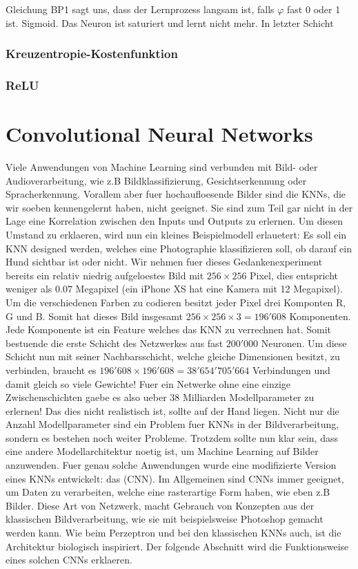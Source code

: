 Gleichung BP1 sagt uns, dass der Lernprozess langsam ist, falls $\varphi$ fast 0
oder 1 ist. Sigmoid. Das Neuron ist saturiert und lernt nicht mehr. In letzter Schicht

\subsection{Kreuzentropie-Kostenfunktion}

\subsection{ReLU}

\pagebreak
\chapter{Convolutional Neural Networks}
Viele Anwendungen von Machine Learning sind verbunden mit Bild- oder
Audioverarbeitung, wie z.B Bildklassifizierung, Gesichtserkennung oder
Spracherkennung.
Vorallem aber fuer hochaufloesende Bilder sind die KNNs, die wir soeben
kennengelernt haben, nicht geeignet. Sie sind zum Teil gar nicht in der
Lage eine Korrelation zwischen den Inputs und Outputs zu erlernen.
Um diesen Umstand zu erklaeren, wird nun ein kleines Beispielmodell erlauetert:
\para{}
Es soll ein KNN designed werden, welches eine Photographie klassifizieren
soll, ob darauf ein Hund sichtbar ist oder nicht. Wir nehmen fuer dieses
Gedankenexperiment bereits ein relativ niedrig aufgeloestes Bild mit $256 \times 256$
Pixel, dies entspricht weniger als $0.07$ Megapixel (ein iPhone XS hat eine Kamera mit
12 Megapixel). Um die verschiedenen Farben zu codieren besitzt jeder Pixel drei Komponten R, G
und B. Somit hat dieses Bild insgesamt $256 \times 256 \times 3 = 196'608$
Komponenten. Jede Komponente ist ein Feature welches das KNN zu verrechnen hat. Somit bestuende
die erste Schicht des Netzwerkes aus fast $200'000$ Neuronen. Um diese Schicht
nun mit seiner Nachbarsschicht, welche gleiche Dimensionen besitzt, zu verbinden, braucht
es $196'608 \times 196'608 = 38'654'705'664$ Verbindungen und damit gleich so
viele Gewichte! Fuer ein Netwerke ohne eine einzige Zwischenschichten gaebe es
also ueber 38 Milliarden Modellparameter zu erlernen! Das dies nicht realistisch ist,
sollte auf der Hand liegen.
\para{}
Nicht nur die Anzahl Modellparameter sind ein Problem fuer KNNs in der
Bildverarbeitung, sondern es bestehen noch weiter Probleme.
Trotzdem sollte nun klar sein, dass eine andere Modellarchitektur noetig ist, um Machine
Learning auf Bilder anzuwenden. Fuer genau solche Anwendungen wurde eine modifizierte
Version eines KNNs entwickelt: das  (CNN).
Im Allgemeinen sind CNNs immer geeignet, um Daten zu verarbeiten, welche eine
rasterartige Form haben, wie eben z.B Bilder.
Diese Art von Netzwerk, macht Gebrauch von Konzepten aus der klassischen
Bildverarbeitung, wie sie mit beispielsweise Photoshop gemacht werden kann.
Wie beim Perzeptron und bei den klassischen KNNs auch, ist die Architektur
biologisch inspiriert.
Der folgende Abschnitt wird die Funktionsweise eines solchen CNNs erklaeren.
\para{}
\cite{Goodfellow-et-al-2016}
\cite{deeplearning.ai:cnn}
\cite{wiki:cnn}

